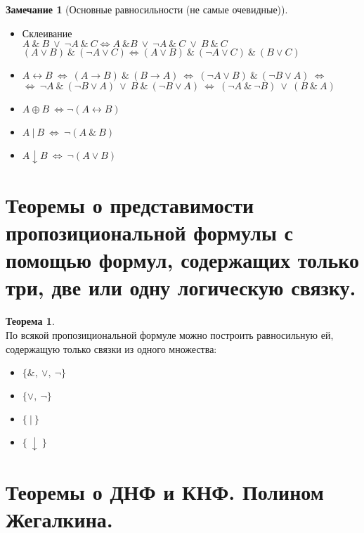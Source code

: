 \documentclass[a4paper,12pt]{article}
\theoremstyle{definition} %
\newtheorem{remark}{Замечание}[section]
\newtheorem{theorem}{Теорема}[section]
\theoremstyle{definition} %
\theoremstyle{remark} %
\begin{document}
	\begin{remark}[Основные равносильности (не самые очевидные)]\
		\begin{itemize}
			\item Склеивание \\[1ex]
			$A \ \& \ B \ \lor \ \neg A \ \& \ C \Leftrightarrow A \ \& B \ \lor \ \neg A \ \& \ C \ \lor \ B \ \& \ C$ \\[1ex]
			$(A \lor B) \ \& \ (\neg A \lor C) \Leftrightarrow (A \lor B) \ \& \ (\neg A \lor C) \ \& \ (B \lor C)$
			\item $A \leftrightarrow B \ \Leftrightarrow \ (A \rightarrow B) \ \& \ (B \rightarrow A) \ \Leftrightarrow \ (\neg A \lor B) \ \& \ (\neg B \lor A) \ \Leftrightarrow$ \\[1ex]
			$\Leftrightarrow \ \neg A \ \& \ (\neg B \lor A) \ \lor \ B \ \& \ (\neg B \lor A) \ \Leftrightarrow \ (\neg A \ \& \ \neg B) \ \lor \ (B \ \& \ A)$ 
			\item $A \oplus B \ \Leftrightarrow \neg(A \leftrightarrow B)$
			\item $A \ | \ B \ \Leftrightarrow \ \neg(A \ \& \ B)$
			\item $A \downarrow B \ \Leftrightarrow \ \neg(A \lor B) $
		\end{itemize}
	\end{remark}

\section{Теоремы о представимости пропозициональной формулы с помощью формул, содержащих только три, две или одну логическую связку.}
	\begin{theorem}\ \\[1ex]
		По всякой пропозициональной формуле можно построить равносильную ей, содержащую только связки из одного множества:
		\begin{itemize}
			\item $\{\&, \ \lor , \ \neg \}$
			\item $\{ \lor , \ \neg \}$
			\item $\{ \ | \ \}$
			\item $\{ \ \downarrow \ \}$
		\end{itemize}
	\end{theorem}

\section{Теоремы о ДНФ и КНФ. Полином Жегалкина.}
\end{document}
